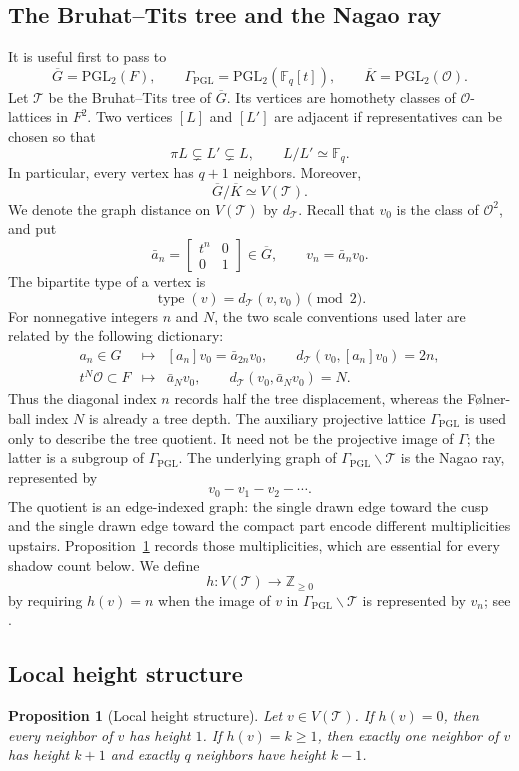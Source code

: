 \documentclass[11pt]{amsart}
\theoremstyle{definition}
\theoremstyle{plain}
\newtheorem{proposition}[definition]{Proposition}
\newcommand{\Fq}{\mathbb F_q}
\newcommand{\cO}{\mathcal O}
\newcommand{\bG}{\overline G}
\newcommand{\GammaP}{\Gamma_{\mathrm{PGL}}}
\newcommand{\bK}{\overline K}
\newcommand{\Tree}{\mathcal T}
\newcommand{\ZZ}{\mathbb Z}
\begin{document}
\subsection{The Bruhat--Tits tree and the Nagao ray}
It is useful first to pass to
\[
\bG=\mathrm{PGL}_2(F),
\qquad
\GammaP=\mathrm{PGL}_2(\Fq[t]),
\qquad
\bK=\mathrm{PGL}_2(\cO).
\]
Let \(\Tree\) be the Bruhat--Tits tree of \(\bG\).  Its vertices are homothety
classes of \(\cO\)-lattices in \(F^2\).  Two vertices \([L]\) and \([L']\)
are adjacent if representatives can be chosen so that
\[
\pi L\subsetneq L'\subsetneq L,
\qquad L/L'\simeq\Fq.
\]
In particular, every vertex has \(q+1\) neighbors.  Moreover,
\[
\bG/\bK\simeq V(\Tree).
\]
We denote the graph distance on \(V(\Tree)\) by \(d_\Tree\).
Recall that \(v_0\) is the class of \(\cO^2\), and put
\[
\bar a_n=\begin{bmatrix}t^n&0\\0&1\end{bmatrix}\in\bG,
\qquad
v_n=\bar a_n v_0.
\]
The bipartite type of a vertex is
\[
\operatorname{type}(v)=d_\Tree(v,v_0)\pmod 2.
\]
For nonnegative integers \(n\) and \(N\), the two scale conventions used later
are related by the following dictionary:
\[
\begin{array}{ccl}
a_n\in G&\longmapsto&[a_n]v_0=\bar a_{2n}v_0,
\qquad d_\Tree(v_0,[a_n]v_0)=2n,\\[2mm]
t^N\cO\subset F&\longmapsto&\bar a_Nv_0,
\qquad d_\Tree(v_0,\bar a_Nv_0)=N.
\end{array}
\]
Thus the diagonal index \(n\) records half the tree displacement, whereas the
F{\o}lner-ball index \(N\) is already a tree depth.
The auxiliary projective lattice \(\GammaP\) is used only to describe the
tree quotient.  It need not be the projective image of \(\Gamma\); the latter
is a subgroup of \(\GammaP\).  The underlying graph of
\(\GammaP\backslash\Tree\) is the Nagao ray, represented by
\[
v_0-v_1-v_2-\cdots.
\]
The quotient is an edge-indexed graph: the single drawn edge toward the cusp
and the single drawn edge toward the compact part encode different
multiplicities upstairs.  Proposition~\ref{prop:local-height} records those
multiplicities, which are essential for every shadow count below.
We define
\[
h:V(\Tree)\longrightarrow\ZZ_{\ge0}
\]
by requiring \(h(v)=n\) when the image of \(v\) in \(\GammaP\backslash\Tree\) is
represented by \(v_n\); see
\cite{Nagao1959,SerreTrees,Tits1979,Kwon2020}.

\subsection{Local height structure}
\begin{proposition}[Local height structure]\label{prop:local-height}
Let \(v\in V(\Tree)\).  If \(h(v)=0\), then every neighbor of \(v\) has height
\(1\).  If \(h(v)=k\ge1\), then exactly one neighbor of \(v\) has height \(k+1\)
and exactly \(q\) neighbors have height \(k-1\).
\end{proposition}
\end{document}
